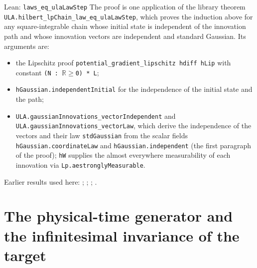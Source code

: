 \documentclass[11pt,a4paper]{report}
\begin{document}
\begin{leanbox}{Lean: \texttt{laws\_\allowbreak{}eq\_\allowbreak{}ulaLawStep}}
The proof is one application of the library theorem \texttt{ULA.\allowbreak{}hilbert\_\allowbreak{}lp\allowbreak{}Chain\_\allowbreak{}law\_\allowbreak{}eq\_\allowbreak{}ula\allowbreak{}Law\allowbreak{}Step}, which proves the induction above for any square-integrable chain whose initial state is independent of the innovation path and whose innovation vectors are independent and standard Gaussian. Its arguments are:



\begin{itemize}


\item the Lipschitz proof \texttt{potential\_\allowbreak{}gradient\_\allowbreak{}lipschitz hdiff h\allowbreak{}Lip} with constant \texttt{(N : \ensuremath{\mathbb R}\ensuremath{\ge}0) * L};

\item \texttt{h\allowbreak{}Gaussian.\allowbreak{}independent\allowbreak{}Initial} for the independence of the initial state and the path;

\item \texttt{ULA.\allowbreak{}gaussian\allowbreak{}Innovations\_\allowbreak{}vector\allowbreak{}Independent} and \texttt{ULA.\allowbreak{}gaussian\allowbreak{}Innovations\_\allowbreak{}vector\allowbreak{}Law}, which derive the independence of the vectors and their law \texttt{std\allowbreak{}Gaussian} from the scalar fields \texttt{h\allowbreak{}Gaussian.\allowbreak{}coordinate\allowbreak{}Law} and \texttt{h\allowbreak{}Gaussian.\allowbreak{}independent} (the first paragraph of the proof); \texttt{h\allowbreak{}W} supplies the almost everywhere measurability of each innovation via \texttt{Lp.\allowbreak{}aestrongly\allowbreak{}Measurable}.

\end{itemize}
\end{leanbox}


Earlier results used here: \cite[Section~3.36.7]{LangevinLean2026ULASC}; \cite[Section~3.41.2]{LangevinLean2026ULASC}; \cite[Section~3.41.3]{LangevinLean2026ULASC}; \cite[Section~3.42.2]{LangevinLean2026ULASC}.
\section{\texorpdfstring{The physical-time generator and the infinitesimal invariance of the target}{The physical-time generator and the infinitesimal invariance of the target}}
\label{proof-module-IPLA-Generator-lean}
\end{document}
